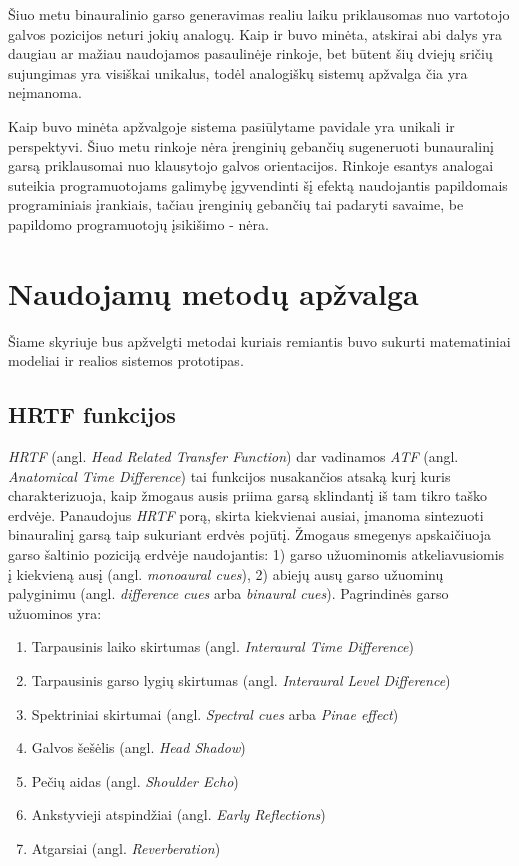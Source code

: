 \documentclass[]{vgtuef}
\begin{document}
Šiuo metu binauralinio garso generavimas realiu laiku priklausomas nuo vartotojo galvos pozicijos neturi jokių analogų. Kaip ir buvo minėta, atskirai abi dalys yra daugiau ar mažiau naudojamos pasaulinėje rinkoje, bet būtent šių dviejų sričių sujungimas yra visiškai unikalus, todėl analogiškų sistemų apžvalga čia yra neįmanoma.

Kaip buvo minėta apžvalgoje sistema pasiūlytame pavidale yra unikali ir perspektyvi. Šiuo metu rinkoje nėra įrenginių gebančių sugeneruoti bunauralinį garsą priklausomai nuo klausytojo galvos orientacijos. Rinkoje esantys analogai suteikia programuotojams galimybę įgyvendinti šį efektą naudojantis papildomais programiniais įrankiais, tačiau įrenginių gebančių tai padaryti savaime, be papildomo programuotojų įsikišimo - nėra.

\section{Naudojamų metodų apžvalga}
\label{sect:naudojami_metodai}

Šiame skyriuje bus apžvelgti metodai kuriais remiantis buvo sukurti matematiniai modeliai ir realios sistemos prototipas.

\subsection{HRTF funkcijos}

\textit{HRTF} (angl. \textit{Head Related Transfer Function}) dar vadinamos \textit{ATF} (angl. \textit{Anatomical Time Difference}) tai funkcijos nusakančios atsaką kurį kuris charakterizuoja, kaip žmogaus ausis priima garsą sklindantį iš tam tikro taško erdvėje. Panaudojus \textit{HRTF} porą, skirta kiekvienai ausiai, įmanoma sintezuoti binauralinį garsą taip sukuriant erdvės pojūtį.  
Žmogaus smegenys apskaičiuoja garso šaltinio poziciją erdvėje naudojantis: 1) garso užuominomis atkeliavusiomis į kiekvieną ausį (angl. \textit{monoaural cues}), 2) abiejų ausų garso užuominų palyginimu (angl. \textit{difference cues} arba \textit{binaural cues}). Pagrindinės garso užuominos yra:
\begin{enumerate}
\item Tarpausinis laiko skirtumas (angl. \textit{Interaural Time Difference})
\item Tarpausinis garso lygių skirtumas (angl. \textit{Interaural Level Difference})
\item Spektriniai skirtumai (angl. \textit{Spectral cues} arba \textit{Pinae effect})
\item Galvos šešėlis (angl. \textit{Head Shadow})
\item Pečių aidas (angl. \textit{Shoulder Echo})
\item Ankstyvieji atspindžiai (angl. \textit{Early Reflections})
\item Atgarsiai (angl. \textit{Reverberation})
\end{enumerate}
\end{document}
